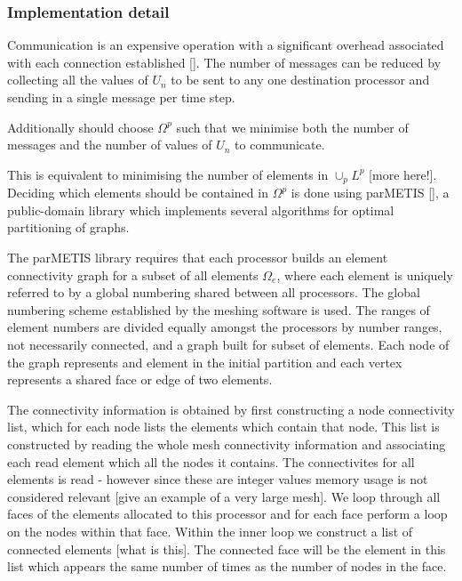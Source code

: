 \subsubsection{Implementation detail}

Communication is an expensive operation with a significant overhead associated with each connection established [].
The number of messages can be reduced by collecting all the values of $U_{n}$ to be sent to any one 
destination processor and sending in a single message per time step.

Additionally should choose $\Omega^p$ such that we minimise both the number of messages and the number of values of $U_{n}$ to communicate.


This is equivalent to minimising the number of elements in $\cup_p L^p$ [more here!]. Deciding which elements should be contained in $\Omega^p$ is done using parMETIS [], a public-domain library which implements several algorithms for optimal partitioning of graphs.

The parMETIS library requires that each processor builds an element connectivity graph for a subset of all elements $\Omega_e$, where each element is uniquely referred to by a global numbering shared between all processors. The global numbering scheme established by the meshing software is used. The ranges of element numbers are divided equally amongst the processors by number ranges, not necessarily connected, and a graph built for subset of elements. Each node of the graph represents and element in the initial partition and each vertex represents a shared face or edge of two elements. 

The connectivity information is obtained by first constructing a node connectivity list, which for each node lists the elements which contain that node. This list is constructed by reading the whole mesh connectivity information and associating each read element which all the nodes it contains. The connectivites for all elements is read - however since these are integer values memory usage is not considered relevant [give an example of a very large mesh]. We loop through all faces of the elements allocated to this processor and for each face perform a loop on the nodes within that face. Within the inner loop we construct a list of connected elements [what is this]. The connected face will be the element in this list which appears the same number of times as the number of nodes in the face.

